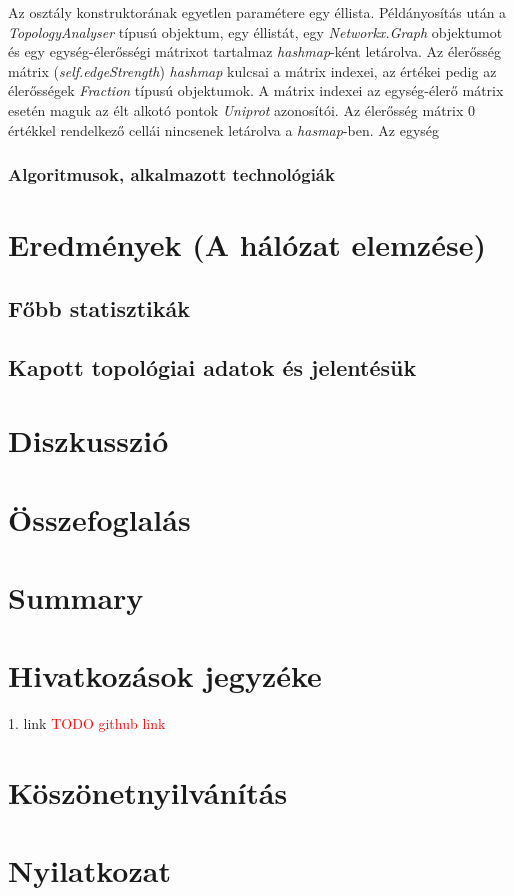 \documentclass[a4paper,12pt]{article}
\begin{document}
		Az osztály konstruktorának egyetlen paramétere egy éllista. Példányosítás után a \textit{TopologyAnalyser} típusú objektum, egy éllistát, egy \textit{Networkx.Graph} objektumot és egy egység-élerősségi mátrixot tartalmaz \textit{hashmap}-ként letárolva. Az élerősség mátrix (\textit{self.edgeStrength}) \textit{hashmap} kulcsai a mátrix indexei, az értékei pedig az élerősségek \textit{Fraction} típusú objektumok. A mátrix indexei az egység-élerő mátrix esetén maguk az élt alkotó pontok \textit{Uniprot} azonosítói. Az élerősség mátrix 0 értékkel rendelkező cellái nincsenek letárolva a \textit{hasmap}-ben. Az egység   
			
		\subsubsection{Algoritmusok, alkalmazott technológiák}

\section{Eredmények (A hálózat elemzése)}
	\subsection{Főbb statisztikák}
	\subsection{Kapott topológiai adatok és jelentésük}
	
\section{Diszkusszió}
\section{Összefoglalás}
\section{Summary}
\section{Hivatkozások jegyzéke}
	1. link \textcolor{red}{TODO github link} \label{lst:github}
\section{Köszönetnyilvánítás}
\section{Nyilatkozat}

\pagebreak


{}

\end{document}
